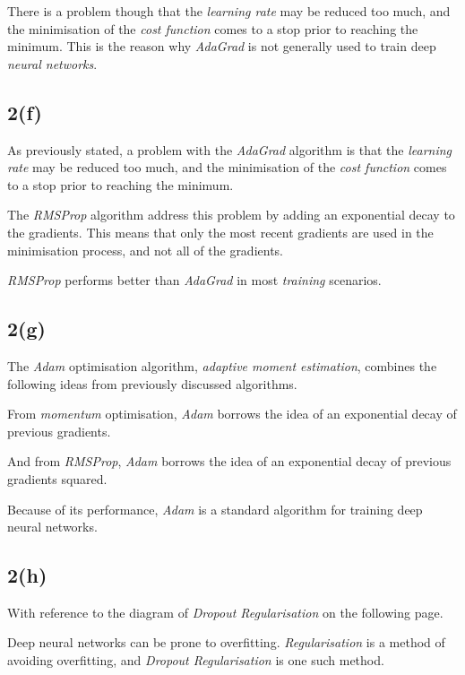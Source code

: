 \documentclass[12pt, a4paper,reqno]{article}
\begin{document}
There is a problem though that the \emph{learning rate} may be reduced too much, and the minimisation of the \emph{cost function} comes to a stop prior to reaching the minimum. This is the reason why \emph{AdaGrad} is not generally used to train deep \emph{neural networks}.
 
\subsection*{2(f)}

As previously stated, a problem with the \emph{AdaGrad} algorithm is that the \emph{learning rate} may be reduced too much, and the minimisation of the \emph{cost function} comes to a stop prior to reaching the minimum.

The \emph{RMSProp} algorithm address this problem by adding an exponential decay to the gradients. This means that only the most recent gradients are used in the minimisation process, and not all of the gradients.

\emph{RMSProp} performs better than \emph{AdaGrad} in most \emph{training} scenarios.

\subsection*{2(g)}

The \emph{Adam} optimisation algorithm, \emph{adaptive moment estimation}, combines the following ideas from previously discussed algorithms.

From \emph{momentum} optimisation, \emph{Adam} borrows the idea of an exponential decay of previous gradients.

And from \emph{RMSProp}, \emph{Adam} borrows the idea of an exponential decay of previous gradients squared.

Because of its performance, \emph{Adam} is a standard algorithm for training deep neural networks.

\subsection*{2(h)}

With reference to the diagram of \emph{Dropout Regularisation} on the following page.

Deep neural networks can be prone to overfitting. \emph{Regularisation} is a method of avoiding overfitting, and \emph{Dropout Regularisation} is one such method.
\end{document}
